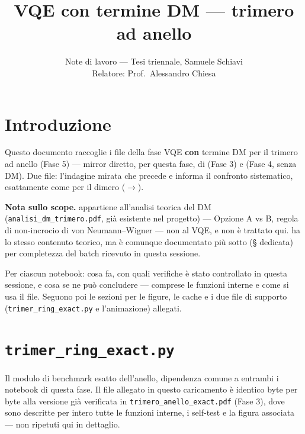\documentclass[11pt,a4paper]{article}
\title{VQE con termine DM — trimero ad anello}
\author{Note di lavoro — Tesi triennale, Samuele Schiavi\\ Relatore: Prof.\ Alessandro Chiesa}
\date{}
\begin{document}
\maketitle

\section*{Introduzione}

Questo documento raccoglie i file della fase VQE \textbf{con} termine DM per il
trimero ad anello (Fase 5) — mirror diretto, per questa fase, di
\texttt{} (Fase 3) e \texttt{}
(Fase 4, senza DM). Due file: l'indagine mirata che precede e informa il confronto
sistematico, esattamente come per il dimero
(\texttt{}$\to$\texttt{}).

\textbf{Nota sullo scope.} \texttt{}
appartiene all'analisi teorica del DM (\texttt{analisi\_dm\_trimero.pdf}, già
esistente nel progetto) — Opzione A vs B, regola di non-incrocio di von
Neumann–Wigner — non al VQE, e non è trattato qui.
\texttt{} ha lo stesso contenuto
teorico, ma è comunque documentato più sotto (§ dedicata) per completezza del batch
ricevuto in questa sessione.

Per ciascun notebook: cosa fa, con quali verifiche è stato controllato in questa
sessione, e cosa se ne può concludere — comprese le funzioni interne e come si usa
il file. Seguono poi le sezioni per le figure, le cache e i due file di supporto
(\texttt{trimer\_ring\_exact.py} e l'animazione) allegati.

\section*{\texttt{trimer\_ring\_exact.py}}

Il modulo di benchmark esatto dell'anello, dipendenza comune a entrambi i notebook
di questa fase. Il file allegato in questo caricamento è identico byte per byte
alla versione già verificata in \texttt{trimero\_anello\_exact.pdf} (Fase 3), dove
sono descritte per intero tutte le funzioni interne, i self-test e la figura
associata — non ripetuti qui in dettaglio.
\end{document}

